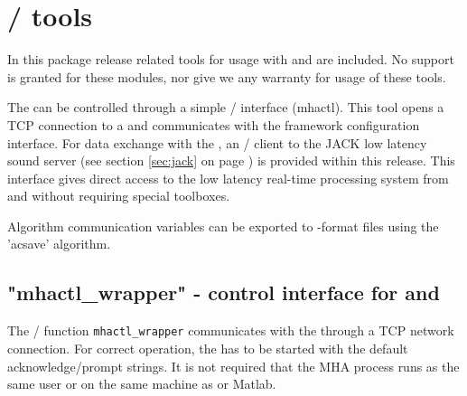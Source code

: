 
\section{\Octave{}/\Matlab{} tools}%
\label{sec:matlab}%

In this package release \mha{} related tools for usage with \Octave{} and \Matlab{} are included.
%
No support
is granted for these modules, nor give we any warranty for usage of
these tools.

The \mhad{} can be controlled through a simple \Octave{}/\Matlab{}
interface (mhactl). This tool opens a TCP connection to a \mhad{} and
communicates with the framework configuration interface.
%
For data exchange with the \mha{}, an \Octave{}/\Matlab{} client to the JACK low latency sound server (see section \ref{sec:jack} on page
\pageref{sec:jack}) is provided within this release.
%
This interface gives direct access to the low latency real-time
processing system from \Octave{} and \Matlab{} without requiring special toolboxes.

Algorithm communication variables can be exported to \Matlab{}-format files
using the 'acsave' algorithm.

\subsection{"mhactl\_wrapper" - \mha{} control interface for \Octave{} and \Matlab{}}
\label{sec:mhactl}

The  \Octave{}/\Matlab{} function \verb!mhactl_wrapper! communicates with the \mhad{}
through a TCP network connection.
%
For correct operation, the \mhad{} has to be started with the
default acknowledge/prompt strings.
%
It is not required that the MHA process runs as the same user or on
the same machine as \Octave{} or Matlab{}.

